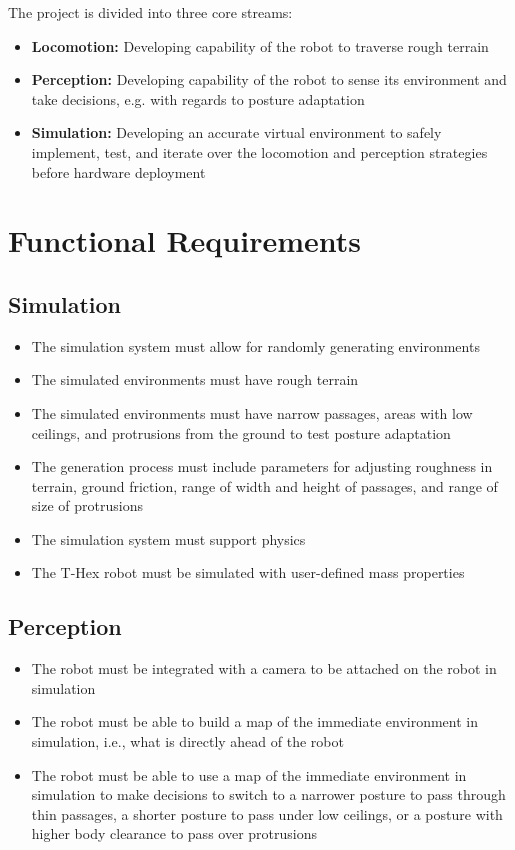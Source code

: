 
The project is divided into three core streams:
\begin{itemize}
    \item \textbf{Locomotion:} Developing capability of the robot to traverse rough terrain
    \item \textbf{Perception:} Developing capability of the robot to sense its environment and take decisions, e.g. with regards to posture adaptation
    \item \textbf{Simulation:} Developing an accurate virtual environment to safely implement, test, and iterate over the locomotion and perception strategies before hardware deployment
\end{itemize}

\section{Functional Requirements}

\subsection{Simulation}
\begin{itemize}
    \item The simulation system must allow for randomly generating environments
    \item The simulated environments must have rough terrain
    \item The simulated environments must have narrow passages, areas with low ceilings, and protrusions from the ground to test posture adaptation
    \item The generation process must include parameters for adjusting roughness in terrain, ground friction, range of width and height of passages, and range of size of protrusions
    \item The simulation system must support physics
    \item The T-Hex robot must be simulated with user-defined mass properties
\end{itemize}

\subsection{Perception}
\begin{itemize}
    \item The robot must be integrated with a camera to be attached on the robot in simulation
    \item The robot must be able to build a map of the immediate environment in simulation, i.e., what is directly ahead of the robot 
    \item The robot must be able to use a map of the immediate environment in simulation to make decisions to switch to a narrower posture to pass through thin passages, a shorter posture to pass under low ceilings, or a posture with higher body clearance to pass over protrusions
\end{itemize}

